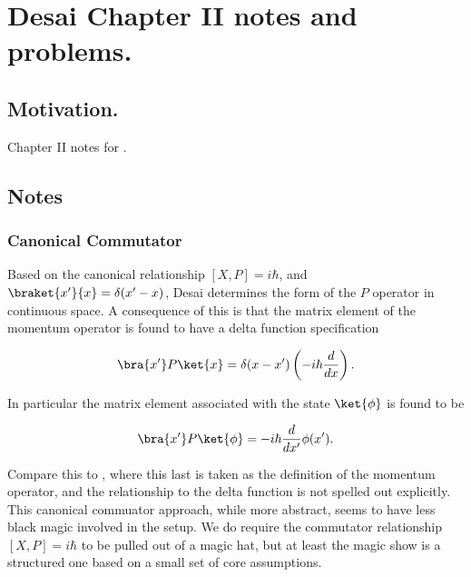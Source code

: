 
%

\chapter{Desai Chapter II notes and problems.}
\label{chap:desaiCh2}
{}
\date{Sept 19, 2010}

\beginArtNoToc

\section{Motivation.}

Chapter II notes for \cite{desai2009quantum}.

\section{Notes}
\subsection{Canonical Commutator}

Based on the canonical relationship $[X,P] = i\hbar$, and $\braket{x'}{x} = \delta(x'-x)$, Desai determines the form of the $P$ operator in continuous space.  A consequence of this is that the matrix element of the momentum operator is found to have a delta function specification

\begin{align*}
\bra{x'} P \ket{x} = \delta(x - x') \left( -i \hbar \frac{d}{dx} \right).
\end{align*}

In particular the matrix element associated with the state $\ket{\phi}$ is found to be

\begin{align*}
\bra{x'} P \ket{\phi} = -i \hbar \frac{d}{dx'} \phi(x').
\end{align*}

Compare this to \cite{liboff2003iqm}, where this last is taken as the definition of the momentum operator, and the relationship to the delta function is not spelled out explicitly.  This canonical commuator approach, while more abstract, seems to have less black magic involved in the setup.  We do require the commutator relationship $[X,P] = i\hbar$ to be pulled out of a magic hat, but at least the magic show is a structured one based on a small set of core assumptions.

